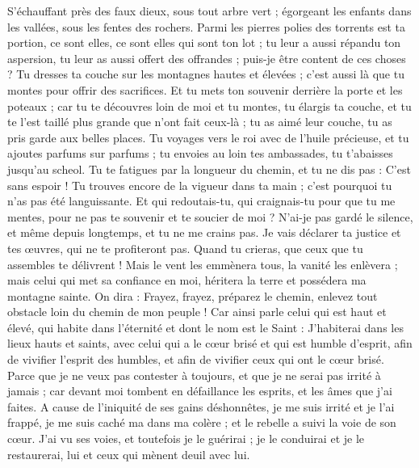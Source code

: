 \begin{multicols}{2}
S'échauffant près des faux dieux, sous tout arbre vert ; égorgeant les enfants dans les vallées, sous les fentes des rochers.
Parmi les pierres polies des torrents est ta portion, ce sont elles, ce sont elles qui sont ton lot ; tu leur a aussi répandu ton aspersion, tu leur as aussi offert des offrandes ; puis-je être content de ces choses ?
Tu dresses ta couche sur les montagnes hautes et élevées ; c'est aussi là que tu montes pour offrir des sacrifices.
Et tu mets ton souvenir derrière la porte et les poteaux ; car tu te découvres loin de moi et tu montes, tu élargis ta couche, et tu te l'est taillé plus grande que n'ont fait ceux-là ; tu as aimé leur couche, tu as pris garde aux belles places.
Tu voyages vers le roi avec de l'huile précieuse, et tu ajoutes parfums sur parfums ; tu envoies au loin tes ambassades, tu t'abaisses jusqu'au scheol.
Tu te fatigues par la longueur du chemin, et tu ne dis pas : C'est sans espoir ! Tu trouves encore de la vigueur dans ta main ; c'est pourquoi tu n'as pas été languissante.
Et qui redoutais-tu, qui craignais-tu pour que tu me mentes, pour ne pas te souvenir et te soucier de moi ? N'ai-je pas gardé le silence, et même depuis longtemps, et tu ne me crains pas.
Je vais déclarer ta justice et tes œuvres, qui ne te profiteront pas.
Quand tu crieras, que ceux que tu assembles te délivrent ! Mais le vent les emmènera tous, la vanité les enlèvera ; mais celui qui met sa confiance en moi, héritera la terre et possédera ma montagne sainte.
On dira : Frayez, frayez, préparez le chemin, enlevez tout obstacle loin du chemin de mon peuple !
Car ainsi parle celui qui est haut et élevé, qui habite dans l'éternité et dont le nom est le Saint : J'habiterai dans les lieux hauts et saints, avec celui qui a le cœur brisé et qui est humble d'esprit, afin de vivifier l'esprit des humbles, et afin de vivifier ceux qui ont le cœur brisé.
Parce que je ne veux pas contester à toujours, et que je ne serai pas irrité à jamais ; car devant moi tombent en défaillance les esprits, et les âmes que j'ai faites.
A cause de l'iniquité de ses gains déshonnêtes, je me suis irrité et je l'ai frappé, je me suis caché ma dans ma colère ; et le rebelle a suivi la voie de son cœur.
J'ai vu ses voies, et toutefois je le guérirai ; je le conduirai et je le restaurerai, lui et ceux qui mènent deuil avec lui.

\end{multicols}
